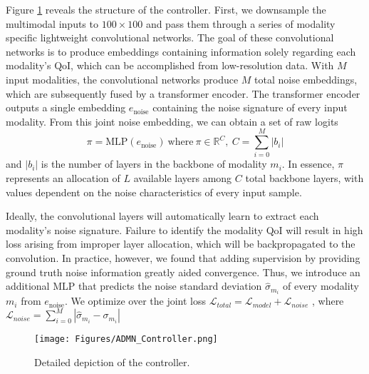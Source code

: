 Figure \ref{fig:admn_controller} reveals the structure of the controller. First, we downsample the multimodal inputs to $100\times100$ and pass them through a series of modality specific lightweight convolutional networks. The goal of these convolutional networks is to produce embeddings containing information solely regarding each modality's QoI, which can be accomplished from low-resolution data. With $M$ input modalities, the convolutional networks produce $M$ total noise embeddings, which are subsequently fused by a transformer encoder. The transformer encoder outputs a single embedding $e_{\mathrm{noise}}$ containing the noise signature of every input modality. From this joint noise embedding, we can obtain a set of raw logits
\begin{equation}
    \pi =\mathrm{MLP}(e_{\mathrm{noise}}) \: \mathrm{where} \: \pi \in \mathbb{R}^{C} ,\: C = \sum^{M}_{i=0}|b_i|
\end{equation}
and $|b_i|$ is the number of layers in the backbone of modality $m_i$. In essence, $\pi$ represents an allocation of $L$ available layers among $C$ total backbone layers, with values dependent on the noise characteristics of every input sample. 

Ideally, the convolutional layers will automatically learn to extract each modality's noise signature. Failure to identify the modality QoI will result in high loss arising from improper layer allocation, which will be backpropagated to the convolution. In practice, however, we found that adding supervision by providing ground truth noise information greatly aided convergence. Thus, we introduce an additional MLP that predicts the noise standard deviation $\hat{\sigma}_{m_i}$ of every modality $m_i$ from $e_{\mathrm{noise}}$. 
We optimize over the joint loss $\mathcal{L}_{total} = \mathcal{L}_{model} + \mathcal{L}_{noise}$ , where $\mathcal{L}_{noise} = \sum_{i=0}^{M} |\hat{\sigma}_{m_i} - \sigma_{m_i}|$


\begin{figure}[t]
    \centering
    \texttt{[image: Figures/ADMN\_Controller.png]}
        \vspace{-0.1in}
    \caption{Detailed depiction of the \name controller.}
    \vspace{-5pt}
    \label{fig:admn_controller}
        \vspace{-0.2in}
\end{figure}


